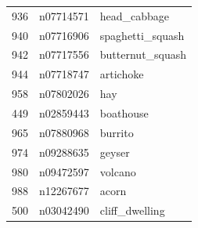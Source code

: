 \begin{table}
\begin{tabular}{cll}
936 & n07714571 & head_cabbage \\
940 & n07716906 & spaghetti_squash \\
942 & n07717556 & butternut_squash \\
944 & n07718747 & artichoke \\
958 & n07802026 & hay \\
449 & n02859443 & boathouse \\
965 & n07880968 & burrito \\
974 & n09288635 & geyser \\
980 & n09472597 & volcano \\
988 & n12267677 & acorn \\
500 & n03042490 & cliff_dwelling \\
\bottomrule
\end{tabular}
\end{table}
